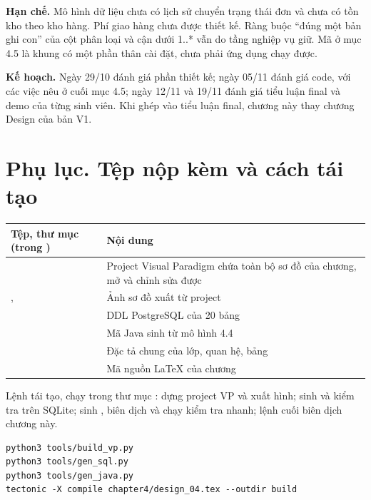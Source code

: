 \documentclass[12pt,a4paper]{article}
\begin{document}
\textbf{Hạn chế.} Mô hình dữ liệu chưa có lịch sử chuyển trạng thái đơn và chưa có tồn kho theo kho
hàng. Phí giao hàng chưa được thiết kế. Ràng buộc ``đúng một bản ghi con'' của cột phân loại và cận dưới
1..* vẫn do tầng nghiệp vụ giữ. Mã ở mục 4.5 là khung có một phần thân cài đặt, chưa phải ứng dụng chạy
được.

\textbf{Kế hoạch.} Ngày 29/10 đánh giá phần thiết kế; ngày 05/11 đánh giá code, với các việc nêu ở cuối
mục 4.5; ngày 12/11 và 19/11 đánh giá tiểu luận final và demo của từng sinh viên. Khi ghép vào tiểu luận
final, chương này thay chương Design của bản V1.

\section*{Phụ lục. Tệp nộp kèm và cách tái tạo}

\begin{table}[H]
\centering\small
\begin{tabular}{@{}P{5.6cm}P{10.0cm}@{}}
\toprule
Tệp, thư mục (trong ) & Nội dung\\
\midrule
{} & Project Visual Paradigm chứa toàn bộ sơ đồ của chương, mở và chỉnh sửa được\\
,  & Ảnh sơ đồ xuất từ project\\
 & DDL PostgreSQL của 20 bảng\\
 & Mã Java sinh từ mô hình 4.4\\
 & Đặc tả chung của lớp, quan hệ, bảng\\
 & Mã nguồn LaTeX của chương\\
\bottomrule
\end{tabular}
\end{table}

Lệnh tái tạo, chạy trong thư mục :  dựng project VP và xuất
hình;  sinh  và kiểm tra trên SQLite;
 sinh , biên dịch và chạy kiểm tra nhanh; lệnh cuối biên dịch
chương này.
\begin{Verbatim}[fontsize=\small,frame=single]
python3 tools/build_vp.py
python3 tools/gen_sql.py
python3 tools/gen_java.py
tectonic -X compile chapter4/design_04.tex --outdir build
\end{Verbatim}
\end{document}
